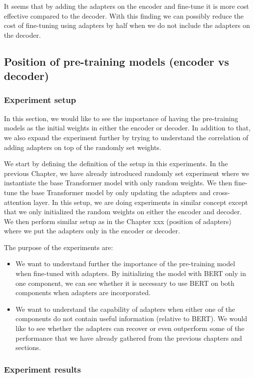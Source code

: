 It seems that by adding the adapters on the encoder and fine-tune it is more cost effective compared to the decoder. With this finding we can possibly reduce the cost of fine-tuning using adapters by half when we do not include the adapters on the decoder.

\subsection{Position of pre-training models (encoder vs decoder)}
\subsubsection{Experiment setup}
In this section, we would like to see the importance of having the pre-training models as the initial weights in either the encoder or decoder. In addition to that, we also expand the experiment further by trying to understand the correlation of adding adapters on top of the randomly set weights.

We start by defining the definition of the setup in this experiments. In the previous Chapter, we have already introduced randomly set experiment where we instantiate the base Transformer model with only random weights. We then fine-tune the base Transformer model by only updating the adapters and cross-attention layer. In this setup, we are doing experiments in similar concept except that we only initialized the random weights on either the encoder and decoder. We then perform similar setup as in the Chapter xxx (position of adapters) where we put the adapters only in the encoder or decoder.

The purpose of the experiments are:
\begin{itemize}
    \item We want to understand further the importance of the pre-training model when fine-tuned with adapters. By initializing the model with BERT only in one component, we can see whether it is necessary to use BERT on both components when adapters are incorporated.
    \item We want to understand the capability of adapters when either one of the components do not contain useful information (relative to BERT). We would like to see whether the adapters can recover or even outperform some of the performance that we have already gathered from the previous chapters and sections.
\end{itemize}

\subsubsection{Experiment results}
